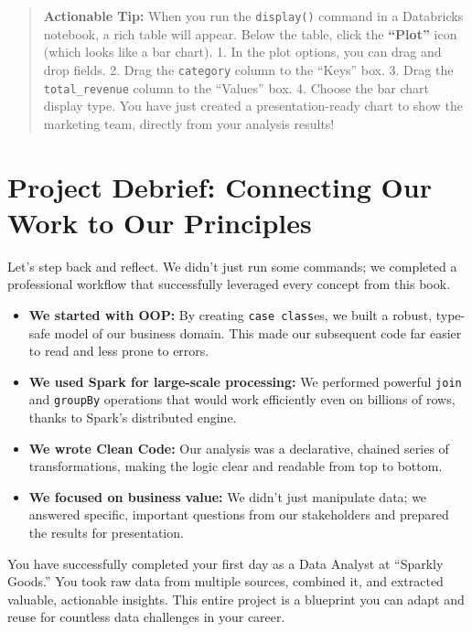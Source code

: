 \documentclass[
  letterpaper,
  DIV=11,
  numbers=noendperiod]{scrreprt}
\providecommand{\tightlist}{%
  \setlength{\itemsep}{0pt}\setlength{\parskip}{0pt}}
\begin{document}
\begin{quote}
\textbf{Actionable Tip:} When you run the \texttt{display()} command in
a Databricks notebook, a rich table will appear. Below the table, click
the \textbf{``Plot''} icon (which looks like a bar chart). 1. In the
plot options, you can drag and drop fields. 2. Drag the
\texttt{category} column to the ``Keys'' box. 3. Drag the
\texttt{total\_revenue} column to the ``Values'' box. 4. Choose the bar
chart display type. You have just created a presentation-ready chart to
show the marketing team, directly from your analysis results!
\end{quote}

\section{Project Debrief: Connecting Our Work to Our
Principles}\label{project-debrief-connecting-our-work-to-our-principles}

Let's step back and reflect. We didn't just run some commands; we
completed a professional workflow that successfully leveraged every
concept from this book.

\begin{itemize}
\tightlist
\item
  \textbf{We started with OOP:} By creating \texttt{case\ class}es, we
  built a robust, type-safe model of our business domain. This made our
  subsequent code far easier to read and less prone to errors.
\item
  \textbf{We used Spark for large-scale processing:} We performed
  powerful \texttt{join} and \texttt{groupBy} operations that would work
  efficiently even on billions of rows, thanks to Spark's distributed
  engine.
\item
  \textbf{We wrote Clean Code:} Our analysis was a declarative, chained
  series of transformations, making the logic clear and readable from
  top to bottom.
\item
  \textbf{We focused on business value:} We didn't just manipulate data;
  we answered specific, important questions from our stakeholders and
  prepared the results for presentation.
\end{itemize}

You have successfully completed your first day as a Data Analyst at
``Sparkly Goods.'' You took raw data from multiple sources, combined it,
and extracted valuable, actionable insights. This entire project is a
blueprint you can adapt and reuse for countless data challenges in your
career.
\end{document}
